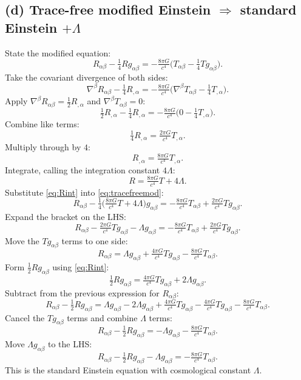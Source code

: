 \documentclass[11pt]{article}
\begin{document}
\subsection*{(d) Trace-free modified Einstein $\Rightarrow$ standard Einstein $+\Lambda$}

State the modified equation:
\begin{equation}
R_{\alpha\beta}-\tfrac{1}{4}Rg_{\alpha\beta}=-\tfrac{8\pi G}{c^4}\bigl(T_{\alpha\beta}-\tfrac{1}{4}Tg_{\alpha\beta}\bigr).
\label{eq:tracefreemod}
\end{equation}
Take the covariant divergence of both sides:
\[
\nabla^\beta R_{\alpha\beta}-\tfrac14 R_{,\alpha}=-\tfrac{8\pi G}{c^4}\bigl(\nabla^\beta T_{\alpha\beta}-\tfrac14 T_{,\alpha}\bigr).
\]
Apply $\nabla^\beta R_{\alpha\beta}=\tfrac12 R_{,\alpha}$ and $\nabla^\beta T_{\alpha\beta}=0$:
\[
\tfrac12 R_{,\alpha}-\tfrac14 R_{,\alpha}=-\tfrac{8\pi G}{c^4}\bigl(0-\tfrac14 T_{,\alpha}\bigr).
\]
Combine like terms:
\[
\tfrac14 R_{,\alpha}=\tfrac{2\pi G}{c^4}T_{,\alpha}.
\]
Multiply through by $4$:
\[
R_{,\alpha}=\tfrac{8\pi G}{c^4}T_{,\alpha}.
\]
Integrate, calling the integration constant $4\Lambda$:
\begin{equation}
R=\tfrac{8\pi G}{c^4}T+4\Lambda.
\label{eq:Rint}
\end{equation}
Substitute \eqref{eq:Rint} into \eqref{eq:tracefreemod}:
\[
R_{\alpha\beta}-\tfrac{1}{4}\bigl(\tfrac{8\pi G}{c^4}T+4\Lambda\bigr)g_{\alpha\beta}=-\tfrac{8\pi G}{c^4}T_{\alpha\beta}+\tfrac{2\pi G}{c^4}Tg_{\alpha\beta}.
\]
Expand the bracket on the LHS:
\[
R_{\alpha\beta}-\tfrac{2\pi G}{c^4}Tg_{\alpha\beta}-\Lambda g_{\alpha\beta}=-\tfrac{8\pi G}{c^4}T_{\alpha\beta}+\tfrac{2\pi G}{c^4}Tg_{\alpha\beta}.
\]
Move the $T g_{\alpha\beta}$ terms to one side:
\[
R_{\alpha\beta}=\Lambda g_{\alpha\beta}+\tfrac{4\pi G}{c^4}Tg_{\alpha\beta}-\tfrac{8\pi G}{c^4}T_{\alpha\beta}.
\]
Form $\tfrac12 R g_{\alpha\beta}$ using \eqref{eq:Rint}:
\[
\tfrac12 Rg_{\alpha\beta}=\tfrac{4\pi G}{c^4}Tg_{\alpha\beta}+2\Lambda g_{\alpha\beta}.
\]
Subtract from the previous expression for $R_{\alpha\beta}$:
\[
R_{\alpha\beta}-\tfrac12 Rg_{\alpha\beta}=\Lambda g_{\alpha\beta}-2\Lambda g_{\alpha\beta}+\tfrac{4\pi G}{c^4}Tg_{\alpha\beta}-\tfrac{4\pi G}{c^4}Tg_{\alpha\beta}-\tfrac{8\pi G}{c^4}T_{\alpha\beta}.
\]
Cancel the $T g_{\alpha\beta}$ terms and combine $\Lambda$ terms:
\[
R_{\alpha\beta}-\tfrac12 Rg_{\alpha\beta}=-\Lambda g_{\alpha\beta}-\tfrac{8\pi G}{c^4}T_{\alpha\beta}.
\]
Move $\Lambda g_{\alpha\beta}$ to the LHS:
\begin{equation}
\boxed{\ R_{\alpha\beta}-\tfrac12 Rg_{\alpha\beta}-\Lambda g_{\alpha\beta}=-\tfrac{8\pi G}{c^4}T_{\alpha\beta}.\ }
\label{eq:Einsteinplus}
\end{equation}
This is the standard Einstein equation with cosmological constant $\Lambda$.
\end{document}
